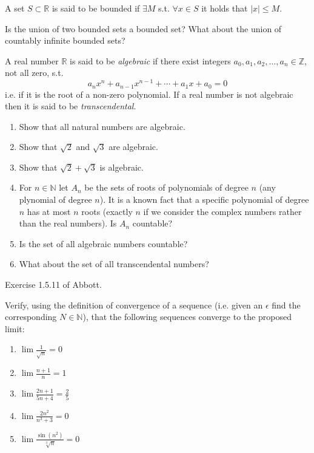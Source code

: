 \documentclass[11pt]{article}%
\newcommand{\R}{\mathbb{R}}
\newcommand{\N}{\mathbb{N}}
\begin{document}
\begin{Exercise}[title=*]
	A set $S\subset\R$ is said to be bounded if $\exists M$ s.t. $\forall x\in S$ it holds that $|x|\leq M$.
	
	Is the union of two bounded sets a bounded set? What about the union of countably infinite bounded sets? 
\end{Exercise}

\begin{Exercise}[title=***]
	A real number $\R$ is said to be \emph{algebraic} if there exist integers $a_0, a_1, a_2,\dots, a_n\in\mathbb{Z}$, not all zero, s.t. 
	\[a_n x^n + a_{n-1}x^{n-1}+\cdots+ a_1x + a_0 =0\]
	i.e. if it is the root of a non-zero polynomial. If a real number is not algebraic then it is said to be \emph{transcendental}.
	\begin{enumerate}
		\item Show that all natural numbers are algebraic.
		\item Show that $\sqrt 2$ and $\sqrt 3$ are algebraic.
		\item Show that $\sqrt2 + \sqrt3$ is algebraic.
		\item For $n\in\N$ let $A_n$ be the sets of roots of polynomials of degree $n$ (any plynomial of degree $n$). It is a known fact that a specific polynomial of degree $n$ has at most $n$ roots (exactly $n$ if we consider the complex numbers rather than the real numbers). Is $A_n$ countable?
		\item Is the set of all algebraic numbers countable?
		\item What about the set of all transcendental numbers?
	\end{enumerate}
\end{Exercise}

\begin{Exercise}[title = ***]
	Exercise 1.5.11 of Abbott.
\end{Exercise}

\begin{Exercise}[title=**$\dagger$]
	Verify, using the definition of convergence of a sequence (i.e. given an $\epsilon$ find the corresponding $N\in\N$), that the following sequences converge to the proposed limit:
	\begin{enumerate}
		\item $\lim \frac{1}{\sqrt n} = 0$
		\item $\lim \frac{n+1}{n} = 1$
		\item $\lim \frac{2n+1}{5n+4} = \frac{2}{5}$
		\item $\lim \frac{2n^2}{n^3+3} = 0$
		\item $\lim \frac{\sin(n^2)}{\sqrt[3]{n}} = 0$
	\end{enumerate}
\end{Exercise}
\end{document}
